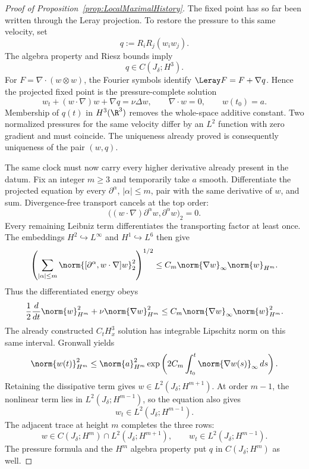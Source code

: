 \begin{proof}[Proof of Proposition~\ref{prop:LocalMaximalHistory}]
The fixed point has so far been written through the Leray projection.  To
restore the pressure to this same velocity, set
\begin{equation}
  q:=R_iR_j(w_iw_j).
  \label{eq:LocalPressureFormula}
\end{equation}
The algebra property and Riesz bounds imply
\[
  q\in C(J_\delta;H^3).
\]
For \(F=\nabla\!\cdot(w\otimes w)\), the Fourier symbols identify
\(\Leray F=F+\nabla q\).  Hence the projected fixed point is the
pressure-complete solution
\[
  w_t+(w\cdot\nabla)w+\nabla q=\nu\Delta w,
  \qquad
  \nabla\cdot w=0,
  \qquad
  w(t_0)=a.
\]
Membership of \(q(t)\) in \(H^3(\R^3)\) removes the whole-space additive
constant.  Two normalized pressures for the same velocity differ by an
\(L^2\) function with zero gradient and must coincide.  The uniqueness
already proved is consequently uniqueness of the pair \((w,q)\).

The same clock must now carry every higher derivative already present in the
datum.  Fix an integer \(m\geq3\) and temporarily take \(a\) smooth.  Differentiate the
projected equation by every \(\partial^\alpha\), \(|\alpha|\leq m\), pair with
the same derivative of \(w\), and sum.  Divergence-free transport cancels at the
top order:
\[
  \bigl((w\cdot\nabla)\partial^\alpha w,\partial^\alpha w\bigr)_2=0.
\]
Every remaining Leibniz term differentiates the transporting factor at least
once.  The embeddings \(H^2\hookrightarrow L^\infty\) and
\(H^1\hookrightarrow L^6\) then give
\[
  \left(
  \sum_{|\alpha|\leq m}
  \norm{[\partial^\alpha,w\cdot\nabla]w}_2^2
  \right)^{1/2}
  \leq C_m\norm{\nabla w}_\infty\norm{w}_{H^m}.
\]
Thus the differentiated energy obeys
\begin{equation}
  \frac12\frac d{dt}\norm{w}_{H^m}^2
  +\nu\norm{\nabla w}_{H^m}^2
  \leq C_m\norm{\nabla w}_\infty\norm{w}_{H^m}^2.
  \label{eq:LocalPersistenceEnergy}
\end{equation}
The already constructed \(C_tH^3_x\) solution has integrable Lipschitz norm on
this same interval.  Gronwall yields
\begin{equation}
  \norm{w(t)}_{H^m}^2
  \leq
  \norm{a}_{H^m}^2
  \exp\left(
    2C_m\int_{t_0}^{t}\norm{\nabla w(s)}_\infty\,ds
  \right).
  \label{eq:LocalPersistenceBound}
\end{equation}
Retaining the dissipative term gives \(w\in L^2(J_\delta;H^{m+1})\).  At order
\(m-1\), the nonlinear term lies in \(L^2(J_\delta;H^{m-1})\), so the equation
also gives
\[
  w_t\in L^2(J_\delta;H^{m-1}).
\]
The adjacent trace at height \(m\) completes the three rows:
\begin{equation}
  w\in C(J_\delta;H^m)
  \cap L^2(J_\delta;H^{m+1}),
  \qquad
  w_t\in L^2(J_\delta;H^{m-1}).
  \label{eq:LocalHigherPersistence}
\end{equation}
The pressure formula and the \(H^m\) algebra property put
\(q\) in \(C(J_\delta;H^m)\) as well.


\end{proof}
